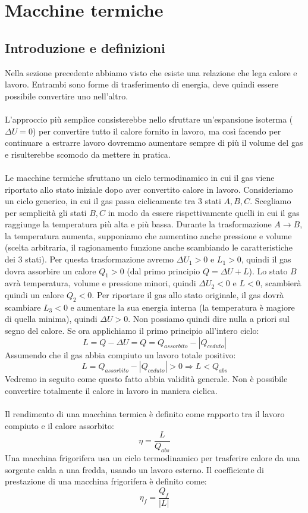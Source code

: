 \documentclass{article}
\begin{document}
\newpage
\section{Macchine termiche}
\subsection{Introduzione e definizioni}
Nella sezione precedente abbiamo visto che esiste una relazione che lega calore e lavoro. Entrambi sono forme di trasferimento di energia, deve quindi essere possibile convertire uno nell'altro.\\\\
L'approccio più semplice consisterebbe nello sfruttare un'espansione isoterma ($\Delta U=0$) per convertire tutto il calore fornito in lavoro, ma così facendo per continuare a estrarre lavoro dovremmo aumentare sempre di più il volume del gas e risulterebbe scomodo da mettere in pratica.\\\\
Le macchine termiche sfruttano un ciclo termodinamico in cui il gas viene riportato allo stato iniziale dopo aver convertito calore in lavoro.
Consideriamo un ciclo generico, in cui il gas passa ciclicamente tra 3 stati $A,B,C$. Scegliamo per semplicità gli stati $B,C$ in modo da essere rispettivamente quelli in cui il gas raggiunge la temperatura più alta e più bassa. Durante la trasformazione $A\rightarrow B$, la temperatura aumenta, supponiamo che aumentino anche pressione e volume (scelta arbitraria, il ragionamento funzione anche scambiando le caratteristiche dei 3 stati). Per questa trasformazione avremo $\Delta U_1>0$ e $L_1>0$, quindi il gas dovra assorbire un calore $Q_1>0$ (dal primo principio $Q=\Delta U + L$). Lo stato $B$ avrà temperatura, volume e pressione minori, quindi $\Delta U_2<0$ e $L<0$, scambierà quindi un calore $Q_2<0$. Per riportare il gas allo stato originale, il gas dovrà scambiare $L_3<0$ e aumentare la sua energia interna (la temperatura è magiore di quella minima), quindi $\Delta U >0$. Non possiamo quindi dire nulla a priori sul segno del calore. Se ora applichiamo il primo principio all'intero ciclo:
$$ L = Q - \Delta U = Q = Q_{assorbito} - |Q_{ceduto}| $$
Assumendo che il gas abbia compiuto un lavoro totale positivo:
$$ L = Q_{assorbito} - |Q_{ceduto}| > 0\Rightarrow L < Q_{abs}$$
Vedremo in seguito come questo fatto abbia validità generale. Non è possibile convertire totalmente il calore in lavoro in maniera ciclica.\\\\
Il rendimento di una macchina termica è definito come rapporto tra il lavoro compiuto e il calore assorbito:
$$ \eta=\frac{L}{Q_{abs}} $$
Una macchina frigorifera usa un ciclo termodinamico per trasferire calore da una sorgente calda a una fredda, usando un lavoro esterno. Il coefficiente di prestazione di una macchina frigorifera è definito come:
$$ \eta_f = \frac{Q_f}{|L|} $$
\end{document}
